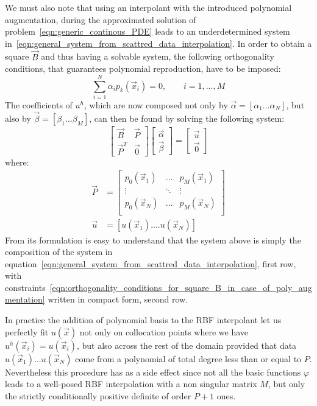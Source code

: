 We must also note that using an interpolant with the introduced polynomial augmentation, during the approximated solution of problem~\eqref{eqn:generic_continous_PDE} leads to an underdetermined system in~\eqref{eqn:general_system_from_scattred_data_interpolation}. In order to obtain a square $\vec{B}$ and thus having a solvable system, the following orthogonality conditions, that guarantees polynomial reproduction, have to be imposed:
\begin{equation}
	\label{eqn:orthogonality_conditions_for_square_B_in_case_of_poly_augmentation}
	\sum_{i=1}^{N} \alpha_i p_k(\vec{x}_i) = 0, \qquad i=1, \dots, M
\end{equation}
The coefficients of $u^h$, which are now composed not only by $\vec{\alpha} = [\alpha_1 \dots \alpha_N]$, but also by $\vec{\beta} = [\beta_1 \dots \beta_M]$, can then be found by solving the following system:
\begin{equation}
	\begin{bmatrix}
		\vec{B}  & \vec{P}  \\
		\vec{P}^T  & \vec{0}
	\end{bmatrix}
	\begin{bmatrix}
		\vec{\alpha}  \\
		\vec{\beta}
	\end{bmatrix}
	=
	\begin{bmatrix}
		\vec{u}  \\
		\vec{0}
	\end{bmatrix}
\end{equation}
where:
\begin{equation}
	\begin{aligned}
		\vec{P} & =
		\begin{bmatrix}
			p_0(\vec{x}_1)  & \dots     & p_M(\vec{x}_1)  \\
			\vdots					 & \ddots  & \vdots						\\
			p_0(\vec{x}_N)  & \dots     & p_M(\vec{x}_N)  \\
		\end{bmatrix}  \\
		\vec{u} & = [u(\vec{x}_1). \dots u(\vec{x}_N)]
	\end{aligned} 
\end{equation}
From its formulation is easy to understand that the system above is simply the composition of the system in equation~\eqref{eqn:general_system_from_scattred_data_interpolation}, first row, with constraints~\eqref{eqn:orthogonality_conditions_for_square_B_in_case_of_poly_augmentation} written in compact form, second row.

In practice the addition of polynomial basis to the RBF interpolant let us perfectly fit $u(\vec{x})$ not only on collocation points where we have $u^h(\vec{x}_i)  = u(\vec{x}_i)$, but also across the rest of the domain provided that data $u(\vec{x}_1) \dots u(\vec{x}_N)$ come from a polynomial of total degree less than or equal to $P$.  Nevertheless this procedure has as a side effect since not all the basic functions $\varphi$ leads to a well-posed RBF interpolation with a non singular matrix $M$, but only the strictly conditionally positive definite of order $P+1$ ones.

